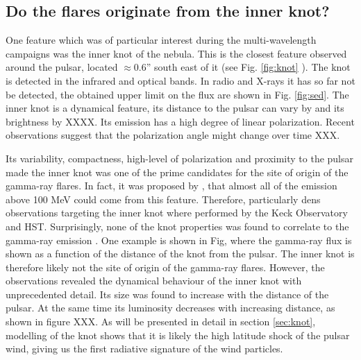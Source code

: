 \subsection{Do the flares originate from the inner knot?}
One feature which was of particular interest during the multi-wavelength campaigns was the inner knot of the nebula. This is the closest feature observed around the pulsar, located $\approx$0.6'' south east of it (see Fig. \ref{fig:knot} ). The knot is detected in the infrared and optical bands. In radio and X-rays it has so far not be detected, the obtained upper limit on the flux are shown in Fig. \ref{fig:sed}. The inner knot is a dynamical feature, its distance to the pulsar can vary by and its brightness by XXXX. Its emission has a high degree of linear polarization. Recent observations suggest that the polarization angle might change over time XXX.  

Its variability, compactness, high-level of polarization and  proximity to the pulsar made the inner knot was one of the prime candidates for the site of origin of the gamma-ray flares.
In fact, it was proposed by , that almost all of the emission above 100 MeV could come from this feature. Therefore, particularly dens observations targeting the inner knot where performed by the Keck Observatory and HST. Surprisingly, none of the knot properties was found to correlate to the gamma-ray emission \cite{rudy2015}. One example is shown in Fig, where the gamma-ray flux is shown as a function of the distance of the knot from the pulsar. The inner knot is therefore likely not the site of origin of the gamma-ray flares. However, the observations revealed the dynamical behaviour of the inner knot with unprecedented detail. Its size was found to increase with the distance of the pulsar. At the same time its luminosity decreases with increasing distance, as shown in figure XXX.  As will be presented in detail in section \ref{sec:knot}, modelling of the knot shows that it is likely the high latitude shock of the pulsar wind, giving us the first radiative signature of the wind particles.